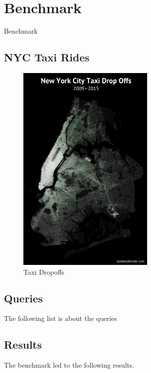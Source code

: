 \chapter{Benchmark}
Benchmark

\newpage

\section{NYC Taxi Rides}

\begin{figure}[H]
\centering
\captionsetup{justification=centering}
\includegraphics[width=0.6\textwidth]{images/taxi_dropoffs_map.png}
\caption[Taxi Dropoffs]{Taxi Dropoffs}
\end{figure}


\section{Queries}
The following list is about the queries

\section{Results}
The benchmark led to the following results.
